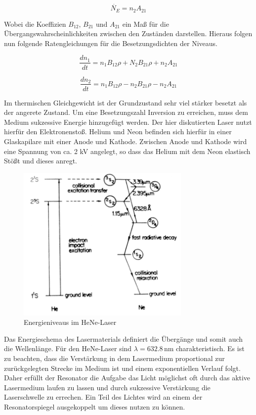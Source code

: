 \begin{equation}
\dot{N_E} = n_2 A_21
\end{equation}

Wobei die Koeffizien $B_12$, $B_21$ und $A_21$ ein Maß für die Übergangswahrscheinlichkeiten zwischen den Zuständen darstellen.
Hieraus folgen nun folgende Ratengleichungen für die Besetzungsdichten der Niveaus.

\begin{equation}
\frac{d n_1}{dt} = n_1 B_12 \rho + N_2 B_21 \rho + n_2 A_21
\end{equation}

\begin{equation}
\frac{d n_2}{dt} = n_1 B_12 \rho - n_2 B_21 \rho - n_2 A_21
\end{equation}

Im thermischen Gleichgewicht ist der Grundzustand sehr viel stärker besetzt als der angerete Zustand. Um eine Besetzungszahl
Inversion zu erreichen, muss dem Medium sukzessive Energie hinzugefügt werden. Der hier diskutierten Laser nutzt hierfür
den Elektronenstoß. Helium und Neon befinden sich hierfür in einer Glaskapilare mit einer Anode und Kathode. Zwischen Anode und Kathode 
wird eine Spannung von ca. 2 kV angelegt, so dass das Helium mit dem Neon elastisch Stößt und dieses anregt.

\begin{figure}
  \centering
  \includegraphics[width=0.75\textwidth]{img/schema.png}
  \caption{Energieniveaus im HeNe-Laser}
  \label{abb:schema}
\end{figure}

Das Energieschema des Lasermaterials definiert die Übergänge und somit auch die Wellenlänge.
Für den HeNe-Laser sind $\lambda = 632.8 \, \text{nm}$ charakteristisch.
Es ist zu beachten, dass die Verstärkung in dem Lasermedium proportional zur zurückgelegten Strecke im Medium ist und einem
exponentiellen Verlauf folgt. Daher erfüllt der Resonator die Aufgabe das Licht möglichst oft durch das aktive Lasermedium
laufen zu lassen und durch sukzessive Verstärkung die Laserschwelle zu errechen. Ein Teil des Lichtes wird an einem der Resonatorspiegel
ausgekoppelt um dieses nutzen zu können.

